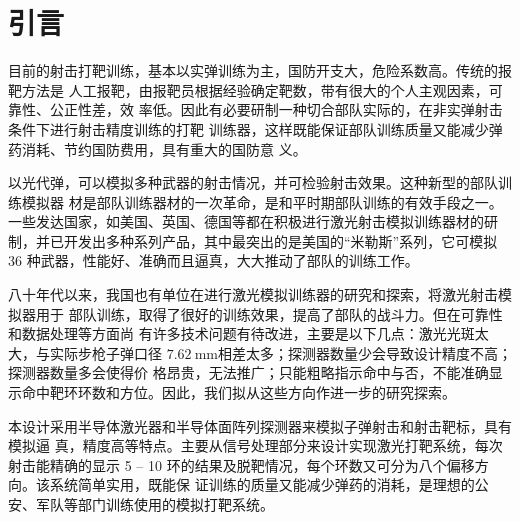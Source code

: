 \chapter{引言}

目前的射击打靶训练，基本以实弹训练为主，国防开支大，危险系数高。传统的报靶方法是
人工报靶，由报靶员根据经验确定靶数，带有很大的个人主观因素，可靠性、公正性差，效
率低。因此有必要研制一种切合部队实际的，在非实弹射击条件下进行射击精度训练的打靶
训练器，这样既能保证部队训练质量又能减少弹药消耗、节约国防费用，具有重大的国防意
义。

以光代弹，可以模拟多种武器的射击情况，并可检验射击效果。这种新型的部队训练模拟器
材是部队训练器材的一次革命，是和平时期部队训练的有效手段之一。一些发达国家，如美国、英国、德国等都在积极进行激光射击模拟训练器材的研制，并已开发出多种系列产品，其中最突出的是美国的“米勒斯”系列，它可模拟 36 种武器，性能好、准确而且逼真，大大推动了部队的训练工作。

八十年代以来，我国也有单位在进行激光模拟训练器的研究和探索，将激光射击模拟器用于
部队训练，取得了很好的训练效果，提高了部队的战斗力。但在可靠性和数据处理等方面尚
有许多技术问题有待改进，主要是以下几点：激光光斑太大，与实际步枪子弹口径
$\qty{7.62}\mm$相差太多；探测器数量少会导致设计精度不高；探测器数量多会使得价
格昂贵，无法推广；只能粗略指示命中与否，不能准确显示命中靶环环数和方位。因此，我们拟从这些方向作进一步的研究探索。

本设计采用半导体激光器和半导体面阵列探测器来模拟子弹射击和射击靶标，具有模拟逼
真，精度高等特点。主要从信号处理部分来设计实现激光打靶系统，每次射击能精确的显示 
5 -- 10 环的结果及脱靶情况，每个环数又可分为八个偏移方向。该系统简单实用，既能保
证训练的质量又能减少弹药的消耗，是理想的公安、军队等部门训练使用的模拟打靶系统。